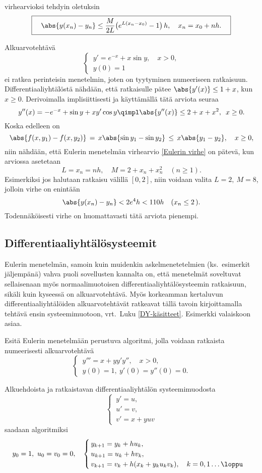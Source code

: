 virhearvioksi tehdyin oletuksin
\begin{equation} \label{Eulerin virhe}
\boxed{\quad
\abs{y(x_n)-y_n} \le \frac{M}{2L}\bigl(e^{L(x_n-x_0)}-1\bigr)\,h, \quad x_n=x_0+nh. \quad}
\end{equation}
\begin{Exa} Alkuarvotehtävä
\[
\begin{cases} \,y'=e^{-x}+x\sin y, \quad x>0, \\ \,y(0)=1 \end{cases}
\]
ei ratkea perinteisin menetelmin, joten on tyytyminen numeeriseen ratkaisuun.
Differentiaaliyhtälöstä nähdään, että ratkaisulle pätee $\abs{y'(x)} \le 1+x$, kun $x \ge 0$.
Derivoimalla implisiittisesti ja käyttämällä tätä arviota seuraa
\[
y''(x)=-e^{-x}+\sin y+xy'\cos y \qimpl \abs{y''(x)} \le 2+x+x^2,\,\ x \ge 0.
\]
Koska edelleen on
\[
\abs{f(x,y_1)-f(x,y_2)}\,=\,x\abs{\sin y_1-\sin y_2}\,\le\,x\abs{y_1-y_2}, \quad x \ge 0,
\]
niin nähdään, että Eulerin menetelmän virhearvio \eqref{Eulerin virhe} on pätevä, kun arviossa
asetetaan
\[
L=x_n=nh, \quad M=2+x_n+x_n^2 \quad (n \ge 1).
\]
Esimerkiksi jos halutaan ratkaisu välillä $[0,2]$, niin voidaan valita $L=2,\ M=8$, jolloin
virhe on enintään
\[
\abs{y(x_n)-y_n} < 2e^4 h < 110 h \quad (x_n \le 2\,).
\]
Todennäköisesti virhe on huomattavasti tätä arviota pienempi. \loppu
\end{Exa}

\subsection*{Differentiaaliyhtälösysteemit}

Eulerin menetelmän, samoin kuin muidenkin askelmenetetelmien (ks.\ esimerkit jäljempänä) vahva
puoli sovellusten kannalta on, että menetelmät soveltuvat sellaisenaan myös normaalimuotoisen 
differentiaaliyhtälösysteemin ratkaisuun, sikäli kuin kyseessä on alkuarvotehtävä. Myös 
korkeamman kertaluvun differentiaaliyhtälöiden alkuarvotehtävät ratkeavat tällä tavoin 
kirjoittamalla tehtävä ensin systeemimuotoon, vrt.\ Luku \ref{DY-käsitteet}. Esimerkki
valaiskoon asiaa.
\begin{Exa} Esitä Eulerin menetelmään perustuva algoritmi, jolla voidaan ratkaista numeerisesti
alkuarvotehtävä
\[
\begin{cases} \,y'''=x+yy'y'', \quad x>0, \\ \,y(0)=1,\ y'(0)=y''(0)=0. \end{cases}
\]
\end{Exa}
\ratk Alkuehdoista ja ratkaistavan differentiaaliyhtälön systeemimuodosta
\[
\begin{cases} \,y'=u, \\ \,u'=v, \\ \,v'=x+yuv \end{cases}
\]
saadaan algoritmiksi
\[
y_0=1,\ u_0=v_0=0, \quad
\begin{cases}
\,y_{k+1}=y_k+hu_k, \\ 
\,u_{k+1}=u_k+hv_k, \\ 
\,v_{k+1}=v_k+h(x_k+y_ku_kv_k), \quad k=0,1 \ldots \loppu
\end{cases}
\]

